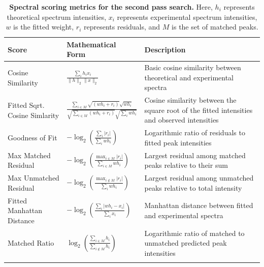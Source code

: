 \documentclass[pdflatex,sn-nature]{sn-jnl}
\begin{document}
{
\renewcommand{\arraystretch}{1.5}
\begin{table}[htbp]
    \centering
    \begin{tabularx}{\textwidth}{@{} l >{\raggedright\arraybackslash}p{} >{\raggedright\arraybackslash}X @{}}
    \toprule
        \textbf{Score} & \textbf{Mathematical Form} & \textbf{Description} \\
    \midrule    
        Cosine Similarity & $\frac{\sum_i h_ix_i}{\|h\|_2\|x\|_2}$ & Basic cosine similarity between theoretical and experimental spectra \\\addlinespace[5pt]
        Fitted Sqrt. Cosine Simlarity & $\frac{\sum_{i\in M} \sqrt{(wh_i + r_i)}\sqrt{wh_i}}{\sqrt{\sum_{i\in M}(wh_i + r_i)}\sqrt{\sum_i wh_i}}$ & Cosine similarity between the square root of the fitted intensities and observed intensities \\\addlinespace[5pt]
        Goodness of Fit & $-\log_2\left(\frac{\sum_i |r_i|}{\sum_i wh_i}\right)$ & Logarithmic ratio of residuals to fitted peak intensities \\\addlinespace[5pt]
        Max Matched Residual & $-\log_2\left(\frac{\max_{i\in M}|r_i|}{\sum_{i\in M}wh_i}\right)$ & Largest residual among matched peaks relative to their sum \\\addlinespace[5pt]
        Max Unmatched Residual & $-\log_2\left(\frac{\max_{i\notin M}|r_i|}{\sum_i wh_i}\right)$ & Largest residual among unmatched peaks relative to total intensity \\\addlinespace[5pt]
        Fitted Manhattan Distance & $-\log_2\left(\frac{\sum_i|wh_i - x_i|}{\sum_i x_i}\right)$ & Manhattan distance between fitted and experimental spectra \\\addlinespace[5pt]
        Matched Ratio & $\log_2\left(\frac{\sum_{i\in M} h_i}{\sum_{i\notin M} h_i}\right)$ & Logarithmic ratio of matched to unmatched predicted peak intensities \\\addlinespace[5pt]
    \bottomrule
    \end{tabularx}
    \caption{\textbf{Spectral scoring metrics for the second pass search.} Here, $h_i$ represents theoretical spectrum intensities, $x_i$ represents experimental spectrum intensities, $w$ is the fitted weight, $r_i$ represents residuals, and $M$ is the set of matched peaks.}
    \label{tab:complex_scores}
\end{table}
}
\end{document}
